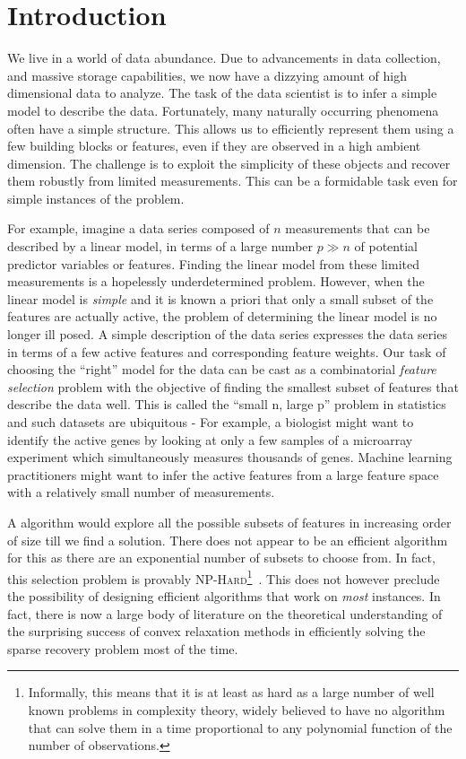 \chapter{Introduction}

We live in a world of data abundance. Due to advancements in data collection,
and massive storage capabilities, we now have a dizzying amount of high
dimensional data to analyze. The task of the data scientist is to infer a simple
model to describe the data. Fortunately, many naturally occurring phenomena
often have a simple structure. This allows us to efficiently represent them
using a few building blocks or features, even if they are observed in a high
ambient dimension. The challenge is to exploit the simplicity of these objects
and recover them robustly from limited measurements. This can be a formidable
task even for simple instances of the problem.

For example, imagine a data series composed of $n$ measurements that can be
described by a linear model, in terms of a large number $p \gg n$ of potential
predictor variables or features. Finding the linear model from these limited
measurements is a hopelessly underdetermined problem. However, when the linear
model is \emph{simple} and it is known a priori that only a small subset of the
features are actually active, the problem of determining the linear model is no
longer ill posed. A simple description of the data series expresses the data
series in terms of a few active features and corresponding feature weights. Our
task of choosing the ``right'' model for the data can be cast as a combinatorial
\emph{feature selection} problem with the objective of finding the smallest
subset of features that describe the data well. This is called the ``small n,
large p'' problem in statistics and such datasets are ubiquitous - For example,
a biologist might want to identify the active genes by looking at only a few
samples of a microarray experiment which simultaneously measures thousands of
genes. Machine learning practitioners might want to infer the active features
from a large feature space with a relatively small number of measurements.

A \naive{} algorithm would explore all the possible subsets of features in
increasing order of size till we find a solution. There does not appear to be an
efficient algorithm for this as there are an exponential number of subsets to
choose from. In fact, this selection problem is provably
\textsc{NP-Hard}\footnote{Informally, this means that it is at least as hard as
a large number of well known problems in complexity theory, widely believed to
have no algorithm that can solve them in a time proportional to any polynomial
function of the number of observations.}~\cite{Natarajan95}. This does not
however preclude the possibility of designing efficient algorithms that work on
\emph{most} instances. In fact, there is now a large body of literature on the
theoretical understanding of the surprising success of convex relaxation methods
in efficiently solving the sparse recovery problem most of the time.

